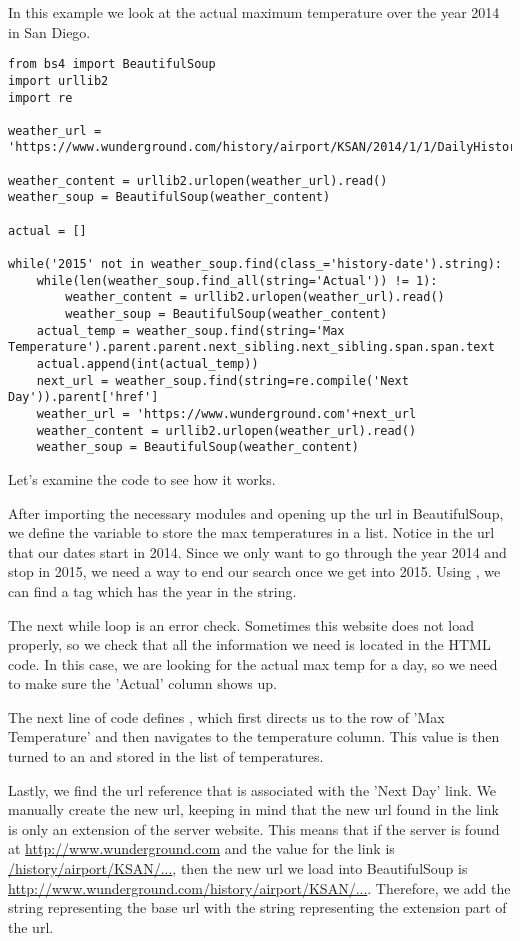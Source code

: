 In this example we look at the actual maximum temperature over the year 2014 in San Diego.
\begin{lstlisting}
from bs4 import BeautifulSoup
import urllib2
import re

weather_url = 'https://www.wunderground.com/history/airport/KSAN/2014/1/1/DailyHistory.html'

weather_content = urllib2.urlopen(weather_url).read()
weather_soup = BeautifulSoup(weather_content)

actual = []

while('2015' not in weather_soup.find(class_='history-date').string):
    while(len(weather_soup.find_all(string='Actual')) != 1):
        weather_content = urllib2.urlopen(weather_url).read()
        weather_soup = BeautifulSoup(weather_content)
    actual_temp = weather_soup.find(string='Max Temperature').parent.parent.next_sibling.next_sibling.span.span.text
    actual.append(int(actual_temp))
    next_url = weather_soup.find(string=re.compile('Next Day')).parent['href']
    weather_url = 'https://www.wunderground.com'+next_url
    weather_content = urllib2.urlopen(weather_url).read()
    weather_soup = BeautifulSoup(weather_content)

\end{lstlisting}
Let's examine the code to see how it works.

After importing the necessary modules and opening up the url in BeautifulSoup, we define the variable  to store the max temperatures in a list.
Notice in the url that our dates start in 2014.
Since we only want to go through the year 2014 and stop in 2015, we need a way to end our search once we get into 2015.
Using , we can find a tag which has the year in the string.

The next while loop is an error check.
Sometimes this website does not load properly, so we check that all the information we need is located in the HTML code.
In this case, we are looking for the actual max temp for a day, so we need to make sure the 'Actual' column shows up.

The next line of code defines , which first directs us to the row of 'Max Temperature' and then navigates to the temperature column.
This value is then turned to an  and stored in the list of temperatures.

Lastly, we find the url reference that is associated with the 'Next Day' link.
We manually create the new url, keeping in mind that the new url found in the link is only an extension of the server website.
This means that if the server is found at \url{http://www.wunderground.com} and the  value for the link is \url{/history/airport/KSAN/...}, then the new url we load into BeautifulSoup is \url{http://www.wunderground.com/history/airport/KSAN/...}.
Therefore, we add the string representing the base url with the string representing the extension part of the url.

